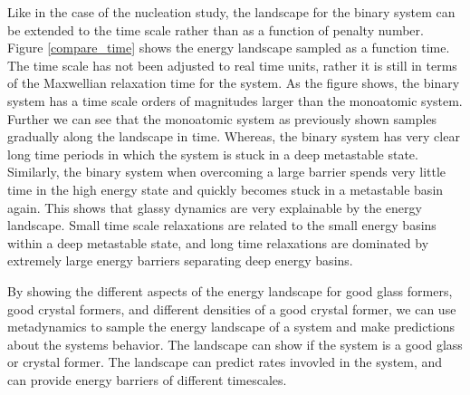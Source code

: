 Like in the case of the nucleation study, the landscape for the binary system can be extended to the time scale rather than as a function of penalty number.  Figure \ref{compare_time} shows the energy landscape sampled as a function time.  The time scale has not been adjusted to real time units, rather it is still in terms of the Maxwellian relaxation time for the system.  As the figure shows, the binary system has a time scale orders of magnitudes larger than the monoatomic system.  Further we can see that the monoatomic system as previously shown samples gradually along the landscape in time.  Whereas, the binary system has very clear long time periods in which the system is stuck in a deep metastable state.  Similarly, the binary system when overcoming a large barrier spends very little time in the high energy state and quickly becomes stuck in a metastable basin again.  This shows that glassy dynamics are very explainable by the energy landscape.  Small time scale relaxations are related to the small energy basins within a deep metastable state, and long time relaxations are dominated by extremely large energy barriers separating deep energy basins.  

By showing the different aspects of the energy landscape for good glass formers, good crystal formers, and different densities of a good crystal former, we can use metadynamics to sample the energy landscape of a system and make predictions about the systems behavior.  The landscape can show if the system is a good glass or crystal former.  The landscape can predict rates invovled in the system, and can provide energy barriers of different timescales.